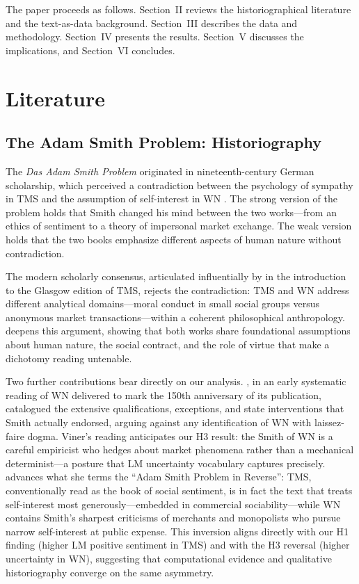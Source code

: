 \documentclass[12pt,a4paper]{article}
\begin{document}
The paper proceeds as follows.
Section~II reviews the historiographical literature and the text-as-data
background.
Section~III describes the data and methodology.
Section~IV presents the results.
Section~V discusses the implications, and Section~VI concludes.

\section{Literature}

\subsection{The Adam Smith Problem: Historiography}

The \textit{Das Adam Smith Problem} originated in nineteenth-century
German scholarship, which perceived a contradiction between the
psychology of sympathy in TMS and the assumption of self-interest in WN
\citep{Montes2003}.
The strong version of the problem holds that Smith changed his mind
between the two works---from an ethics of sentiment to a theory of
impersonal market exchange.
The weak version holds that the two books emphasize different aspects of
human nature without contradiction.

The modern scholarly consensus, articulated influentially by
\citet{RaphaelMacfie1976} in the introduction to the Glasgow edition of
TMS, rejects the contradiction: TMS and WN address different analytical
domains---moral conduct in small social groups versus anonymous market
transactions---within a coherent philosophical anthropology.
\citet{Evensky2005} deepens this argument, showing that both works share
foundational assumptions about human nature, the social contract, and the
role of virtue that make a dichotomy reading untenable.

Two further contributions bear directly on our analysis.
\citet{Viner1927}, in an early systematic reading of WN delivered to mark
the 150th anniversary of its publication, catalogued the extensive
qualifications, exceptions, and state interventions that Smith actually
endorsed, arguing against any identification of WN with laissez-faire
dogma.
Viner's reading anticipates our H3 result: the Smith of WN is a careful
empiricist who hedges about market phenomena rather than a mechanical
determinist---a posture that LM uncertainty vocabulary captures precisely.
\citet{Paganelli2008} advances what she terms the ``Adam Smith Problem in
Reverse'': TMS, conventionally read as the book of social sentiment, is in
fact the text that treats self-interest most generously---embedded in
commercial sociability---while WN contains Smith's sharpest criticisms of
merchants and monopolists who pursue narrow self-interest at public expense.
This inversion aligns directly with our H1 finding (higher LM positive
sentiment in TMS) and with the H3 reversal (higher uncertainty in WN),
suggesting that computational evidence and qualitative historiography
converge on the same asymmetry.
\end{document}
